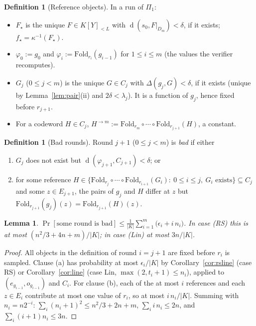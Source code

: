 \documentclass[11pt]{article}
\newtheorem{lemma}[theorem]{Lemma}
\theoremstyle{definition}
\newtheorem{definition}[theorem]{Definition}
\newcommand{\K}{K}
\newcommand{\Fold}{\mathrm{Fold}}
\DeclareMathOperator{\dist}{d}
\begin{document}
\begin{definition}[Reference objects]\label{def:refs}
In a run of $\Pi_1$:
\begin{itemize}[leftmargin=*]
\item $F_\star$ is the unique $F\in\K[Y]_{<L}$ with $\dist(s_0,F|_{D_m})<\delta$, if it exists; $f_\star=\kappa^{-1}(F_\star)$.
\item $\varphi_0:=g_0$ and $\varphi_i:=\Fold_{r_i}(g_{i-1})$ for $1\le i\le m$ (the values the verifier recomputes).
\item $G_j$ ($0\le j<m$) is the unique $G\in C_j$ with $\Delta(g_j,G)<\delta$, if it exists (unique by Lemma~\ref{lem:pair}(ii) and $2\delta<\lambda_j$). It is a function of $g_j$, hence fixed before $r_{j+1}$.
\item For a codeword $H\in C_j$, $H^{\to m}:=\Fold_{r_m}\circ\cdots\circ\Fold_{r_{j+1}}(H)$, a constant.
\end{itemize}
\end{definition}

\begin{definition}[Bad rounds]
Round $j+1$ ($0\le j<m$) is \emph{bad} if either
\begin{enumerate}[label=(\alph*)]
\item $G_j$ does not exist but $\dist(\varphi_{j+1},C_{j+1})<\delta$; or
\item for some reference $H\in\{\Fold_{r_j}\circ\cdots\circ\Fold_{r_{i+1}}(G_i):\ 0\le i\le j,\ G_i\text{ exists}\}\subseteq C_j$ and some $z\in E_{j+1}$, the pairs of $g_j$ and $H$ differ at $z$ but $\Fold_{r_{j+1}}(g_j)(z)=\Fold_{r_{j+1}}(H)(z)$.
\end{enumerate}
\end{definition}

\begin{lemma}\label{lem:badrounds}
$\displaystyle\Pr[\text{some round is bad}]\le\frac{1}{|\K|}\sum_{i=1}^m\big(\epsilon_i+i\,n_i\big)$. In case (RS) this is at most $(n^2/3+4n+m)/|\K|$; in case (Lin) at most $3n/|\K|$.
\end{lemma}
\begin{proof}
All objects in the definition of round $i=j+1$ are fixed before $r_i$ is sampled. Clause (a) has probability at most $\epsilon_i/|\K|$ by Corollary~\ref{cor:rsline} (case RS) or Corollary~\ref{cor:line} (case Lin, $\max(2,t_i+1)\le n_i$), applied to $(e_{g_{i-1}},o_{g_{i-1}})$ and $C_i$. For clause (b), each of the at most $i$ references and each $z\in E_i$ contribute at most one value of $r_i$, so at most $i\,n_i/|\K|$. Summing with $n_i=n2^{-i}$: $\sum_i(n_i+1)^2\le n^2/3+2n+m$, $\sum_i i\,n_i\le2n$, and $\sum_i(i+1)n_i\le3n$.
\end{proof}
\end{document}
